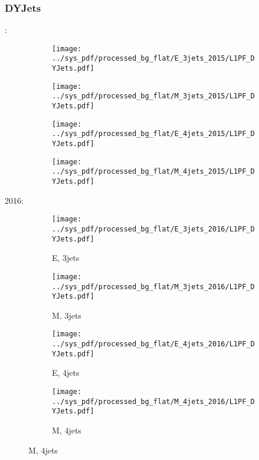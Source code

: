 \documentclass{beamer}
\begin{document}
\begin{frame}
\frametitle{DYJets}
\fontsize{5}{1}:
\begin{figure}
\centering
\begin{subfigure}[b]{0.24\textwidth}
\texttt{[image: ../sys\_pdf/processed\_bg\_flat/E\_3jets\_2015/L1PF\_DYJets.pdf]}
\end{subfigure}
\begin{subfigure}[b]{0.24\textwidth}
\texttt{[image: ../sys\_pdf/processed\_bg\_flat/M\_3jets\_2015/L1PF\_DYJets.pdf]}
\end{subfigure}
\begin{subfigure}[b]{0.24\textwidth}
\texttt{[image: ../sys\_pdf/processed\_bg\_flat/E\_4jets\_2015/L1PF\_DYJets.pdf]}
\end{subfigure}
\begin{subfigure}[b]{0.24\textwidth}
\texttt{[image: ../sys\_pdf/processed\_bg\_flat/M\_4jets\_2015/L1PF\_DYJets.pdf]}
\end{subfigure}
\end{figure}
2016:
\begin{figure}
\centering
\begin{subfigure}[b]{0.24\textwidth}
\texttt{[image: ../sys\_pdf/processed\_bg\_flat/E\_3jets\_2016/L1PF\_DYJets.pdf]}
\captionsetup{font=tiny}
\caption{E, 3jets}
\end{subfigure}
\begin{subfigure}[b]{0.24\textwidth}
\texttt{[image: ../sys\_pdf/processed\_bg\_flat/M\_3jets\_2016/L1PF\_DYJets.pdf]}
\captionsetup{font=tiny}
\caption{M, 3jets}
\end{subfigure}
\begin{subfigure}[b]{0.24\textwidth}
\texttt{[image: ../sys\_pdf/processed\_bg\_flat/E\_4jets\_2016/L1PF\_DYJets.pdf]}
\captionsetup{font=tiny}
\caption{E, 4jets}
\end{subfigure}
\begin{subfigure}[b]{0.24\textwidth}
\texttt{[image: ../sys\_pdf/processed\_bg\_flat/M\_4jets\_2016/L1PF\_DYJets.pdf]}
\captionsetup{font=tiny}
\caption{M, 4jets}
\end{subfigure}
\end{figure}
\end{frame}
\end{document}
